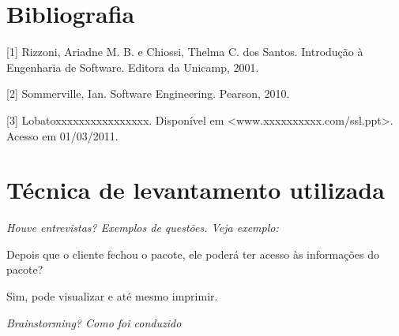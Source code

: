 \documentclass[12pt,twoside,a4paper]{article}
\begin{document}
\section{Bibliografia}

[1]  Rizzoni, Ariadne M. B. e Chiossi, Thelma C. dos Santos. Introdução à Engenharia de Software. Editora da Unicamp, 2001.

[2]  Sommerville, Ian. Software Engineering. Pearson, 2010.

[3]  Lobatoxxxxxxxxxxxxxxxx. Disponível em <www.xxxxxxxxxx.com/ssl.ppt>. Acesso em 01/03/2011.

\section{Técnica de levantamento utilizada}

\textit{Houve entrevistas? Exemplos de questões. Veja exemplo:}

Depois que o cliente fechou o pacote, ele poderá ter acesso às informações do pacote?

Sim, pode visualizar e até mesmo imprimir.


\textit{Brainstorming? Como foi conduzido}
\end{document}
